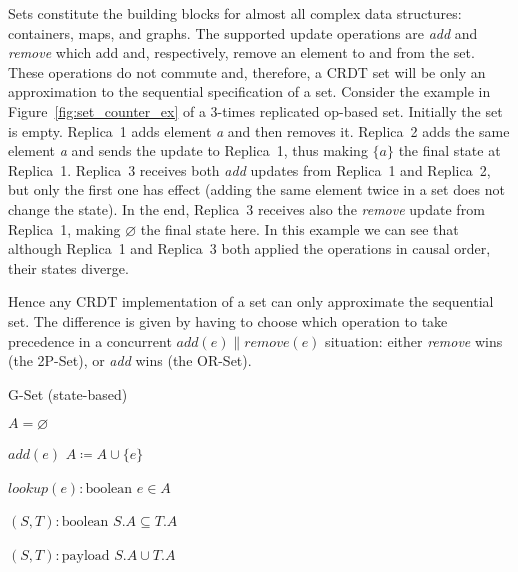 Sets constitute the building blocks for almost all complex data structures:
containers, maps, and graphs. The supported update operations are \textit{add}
and \textit{remove} which add and, respectively, remove an element to and from
the set. These operations do not commute and, therefore, a CRDT set will be only
an approximation to the sequential specification of a set. Consider the example
in Figure~\ref{fig:set_counter_ex} of a 3-times replicated op-based set.
Initially the set is empty. Replica~1 adds element \textit{a} and then removes
it. Replica~2 adds the same element \textit{a} and sends the update to
Replica~1, thus making $\{a\}$ the final state at Replica~1. Replica~3 receives
both \textit{add} updates from Replica~1 and Replica~2, but only the first one
has effect (adding the same element twice in a set does not change the state).
In the end, Replica~3 receives also the \textit{remove} update from Replica~1,
making $\varnothing$ the final state here. In this example we can see that
although Replica~1 and Replica~3 both applied the operations in causal order,
their states diverge. 

Hence any CRDT implementation of a set can only approximate the sequential set.
The difference is given by having to choose which operation to take precedence
in a concurrent $\textit{add}(e) \parallel \textit{remove}(e)$ situation: either
\textit{remove} wins (the 2P-Set), or \textit{add} wins (the OR-Set).

\begin{algorithm}[t]
\small{
	\caption{G-Set (state-based)}
 	\label{alg:g_set_state_based}                       

 	\begin{algorithmic}[1]
 	  \State \Payload $A = \varnothing$
 	  
 	  \State \Update $add(e)$
 	  \State \hspace{\algorithmicindent} $A \coloneqq A \cup \{e\}$
 	  
 	  \State \Query $lookup(e) : \text{boolean}$
 	  \State \hspace{\algorithmicindent} \Return $e \in A$
 	  
 	  \State \Compare $(S, T) : \text{boolean}$
 	  \State \hspace{\algorithmicindent} \Return $S.A \subseteq T.A$
 	  
 	  \State \Merge $(S, T) : \text{payload}$
 	  \State \hspace{\algorithmicindent} \Return $S.A \cup T.A$
	\end{algorithmic}
 }
\end{algorithm}

